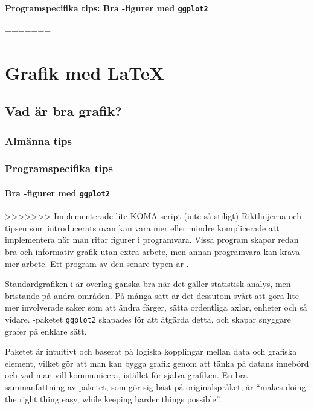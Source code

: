 \documentclass[10pt,../../a4.tex]{subfiles}
\begin{document}
\subsubsection{Programspecifika tips: %
			   Bra \Rlogo-figurer med \texttt{ggplot2}}
=======
\chapter{Grafik med \LaTeX}\label{sec:4}
\section{Vad är bra grafik?}
\subsection{Almänna tips}
\subsection{Programspecifika tips}
\subsubsection*{Bra \Rlogo-figurer med \texttt{ggplot2}}
>>>>>>> Implementerade lite KOMA-script (inte så stiligt)
\label{sec:ggplot2}
Riktlinjerna och tipsen som introducerats ovan kan vara mer eller mindre
komplicerade att implementera när man ritar figurer i programvara. Vissa
program skapar redan bra och informativ grafik utan extra arbete, men
annan programvara kan kräva mer arbete. Ett program av den senare typen
är \Rlogo.

Standardgrafiken i \Rlogo är överlag ganska bra när det gäller statistisk
analys, men bristande på andra områden. På många sätt är det dessutom 
svårt att göra lite mer involverade saker som att ändra färger, sätta
ordentliga axlar, enheter och så vidare. \Rlogo-paketet \texttt{ggplot2}
skapades för att åtgärda detta, och skapar snyggare grafer på enklare
sätt.

Paketet är intuitivt och baserat på logiska kopplingar mellan data och
grafiska element, vilket gör att man kan bygga grafik genom att tänka
på datans innebörd och vad man vill kommunicera, istället för själva 
grafiken. En bra sammanfattning av paketet, som gör sig bäst på
originalspråket, är \foreignquote{british}{makes doing the right thing
easy, while keeping harder things possible}.
\end{document}
